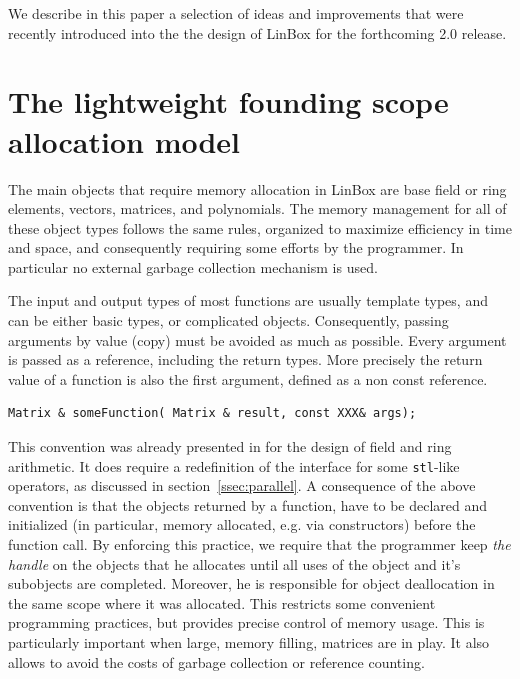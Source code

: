 \documentclass[runningheads,a4paper]{llncs}
\newcommand{\linbox}{{\sc LinBox}\xspace}
\begin{document}
We describe in this paper a selection of ideas and
improvements that were recently introduced into the the design of \linbox
for the forthcoming 2.0 release.

\section{The lightweight founding scope allocation model}

The main objects that require memory allocation in \linbox are base field or
ring elements, vectors, matrices, and polynomials.
The memory management for all of these object types follows the same rules, organized to
maximize efficiency in time and space, and consequently requiring some
efforts by  the programmer. In particular no external garbage collection
mechanism is used.

The input and output types of most functions are usually template
types, and can be either basic types, or complicated
objects. Consequently, passing arguments by value (copy) must be avoided as
much as possible. Every argument is passed as a reference, including
the return types. More precisely the return value of a function is
also the first argument, defined as a non const reference. 
\begin{verbatim}
Matrix & someFunction( Matrix & result, const XXX& args);
\end{verbatim}
This convention was already presented in \cite[\S 2.1]{jgd:2002:icms} for the
design of field and ring arithmetic. It does require a redefinition of the interface
for some \texttt{stl}-like operators, as discussed in
section~\ref{ssec:parallel}.
%
A consequence of the above convention is that the objects returned by
a function,
have to be declared and initialized (in particular, memory allocated, e.g. via constructors) before the
function call.
By enforcing this
practice, we require that the programmer keep 
\textit{the handle} on the
objects that he allocates until all uses of the object and it's subobjects are completed. Moreover, he is responsible for object 
deallocation in the same 
scope where it was allocated. 
This restricts some convenient programming practices, but provides precise control of memory usage.
This is particularly important when large, memory filling, matrices
are in play.
It also allows to avoid the costs of garbage 
collection or reference counting.
\end{document}

